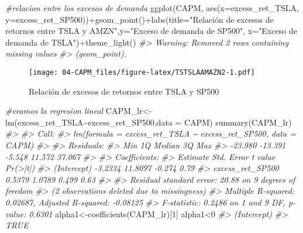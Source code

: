 \documentclass[
]{book}
\newenvironment{Shaded}{\begin{snugshade}}{\end{snugshade}}
\newcommand{\AttributeTok}[1]{\textcolor[rgb]{0.77,0.63,0.00}{#1}}
\newcommand{\CommentTok}[1]{\textcolor[rgb]{0.56,0.35,0.01}{\textit{#1}}}
\newcommand{\DecValTok}[1]{\textcolor[rgb]{0.00,0.00,0.81}{#1}}
\newcommand{\FunctionTok}[1]{\textcolor[rgb]{0.00,0.00,0.00}{#1}}
\newcommand{\NormalTok}[1]{#1}
\newcommand{\OtherTok}[1]{\textcolor[rgb]{0.56,0.35,0.01}{#1}}
\newcommand{\SpecialCharTok}[1]{\textcolor[rgb]{0.00,0.00,0.00}{#1}}
\newcommand{\StringTok}[1]{\textcolor[rgb]{0.31,0.60,0.02}{#1}}
\begin{document}
\begin{Shaded}
\begin{Highlighting}[]
\CommentTok{\#relacion entre los excesos de demanda}
\FunctionTok{ggplot}\NormalTok{(CAPM, }\FunctionTok{aes}\NormalTok{(}\AttributeTok{x=}\NormalTok{excess\_ret\_TSLA, }\AttributeTok{y=}\NormalTok{excess\_ret\_SP500))}\SpecialCharTok{+}\FunctionTok{geom\_point}\NormalTok{()}\SpecialCharTok{+}\FunctionTok{labs}\NormalTok{(}\AttributeTok{title=}\StringTok{"Relación de excesos de retornos entre TSLA y AMZN"}\NormalTok{,}\AttributeTok{y=}\StringTok{"Exceso de demanda de SP500"}\NormalTok{, }\AttributeTok{x=}\StringTok{"Exceso de demanda de TSLA"}\NormalTok{)}\SpecialCharTok{+}\FunctionTok{theme\_light}\NormalTok{()}
\CommentTok{\#\textgreater{} Warning: Removed 2 rows containing missing values}
\CommentTok{\#\textgreater{} (geom\_point).}
\end{Highlighting}
\end{Shaded}

\begin{figure}
\centering
\texttt{[image: 04-CAPM\_files/figure-latex/TSTSLAAMAZN2-1.pdf]}
\caption{\label{fig:TSTSLAAMAZN2}Relación de excesos de retornos entre TSLA y SP500}
\end{figure}

\begin{Shaded}
\begin{Highlighting}[]
\CommentTok{\#veamos la regresion lineal}
\NormalTok{CAPM\_lr}\OtherTok{\textless{}{-}}\FunctionTok{lm}\NormalTok{(excess\_ret\_TSLA}\SpecialCharTok{\textasciitilde{}}\NormalTok{excess\_ret\_SP500,}\AttributeTok{data =}\NormalTok{ CAPM)}
\FunctionTok{summary}\NormalTok{(CAPM\_lr)}
\CommentTok{\#\textgreater{} }
\CommentTok{\#\textgreater{} Call:}
\CommentTok{\#\textgreater{} lm(formula = excess\_ret\_TSLA \textasciitilde{} excess\_ret\_SP500, data = CAPM)}
\CommentTok{\#\textgreater{} }
\CommentTok{\#\textgreater{} Residuals:}
\CommentTok{\#\textgreater{}     Min      1Q  Median      3Q     Max }
\CommentTok{\#\textgreater{} {-}23.980 {-}13.391  {-}5.548  11.572  37.067 }
\CommentTok{\#\textgreater{} }
\CommentTok{\#\textgreater{} Coefficients:}
\CommentTok{\#\textgreater{}                  Estimate Std. Error t value Pr(\textgreater{}|t|)}
\CommentTok{\#\textgreater{} (Intercept)       {-}3.2334    11.8097  {-}0.274     0.79}
\CommentTok{\#\textgreater{} excess\_ret\_SP500   0.5379     1.0789   0.499     0.63}
\CommentTok{\#\textgreater{} }
\CommentTok{\#\textgreater{} Residual standard error: 20.88 on 9 degrees of freedom}
\CommentTok{\#\textgreater{}   (2 observations deleted due to missingness)}
\CommentTok{\#\textgreater{} Multiple R{-}squared:  0.02687,    Adjusted R{-}squared:  {-}0.08125 }
\CommentTok{\#\textgreater{} F{-}statistic: 0.2486 on 1 and 9 DF,  p{-}value: 0.6301}
\NormalTok{alpha1}\OtherTok{\textless{}{-}}\FunctionTok{coefficients}\NormalTok{(CAPM\_lr)[}\DecValTok{1}\NormalTok{]}
\NormalTok{alpha1}\SpecialCharTok{\textless{}}\DecValTok{0}
\CommentTok{\#\textgreater{} (Intercept) }
\CommentTok{\#\textgreater{}        TRUE}
\end{Highlighting}
\end{Shaded}
\end{document}
